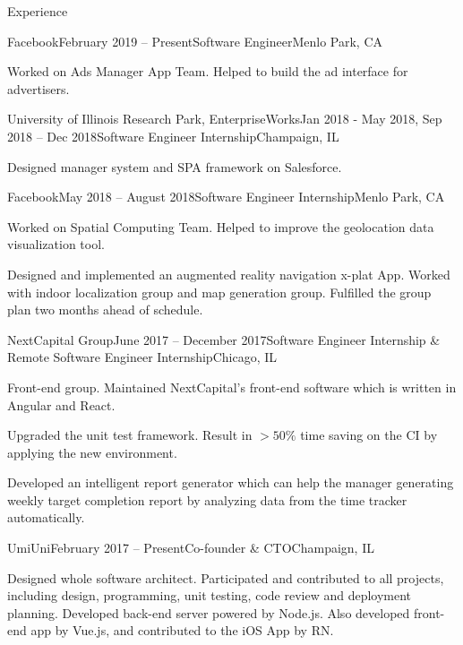 \documentclass{resume} %
\begin{document}
\begin{rSection}{Experience}

\begin{rSubsection}{Facebook}{February 2019 -- Present}{Software Engineer}{Menlo Park, CA}
\item Worked on Ads Manager App Team. Helped to build the ad interface for advertisers.
\end{rSubsection}

\begin{rSubsection}{University of Illinois Research Park, EnterpriseWorks}{Jan 2018 - May 2018, Sep 2018 -- Dec 2018}{Software Engineer Internship}{Champaign, IL}
\item Designed manager system and SPA framework on Salesforce.
\end{rSubsection}

\begin{rSubsection}{Facebook}{May 2018 -- August 2018}{Software Engineer Internship}{Menlo Park, CA}
\item Worked on Spatial Computing Team. Helped to improve the geolocation data visualization tool.
\item Designed and implemented an augmented reality navigation x-plat App. Worked with indoor localization group and map generation group. Fulfilled the group plan two months ahead of schedule.
\end{rSubsection}

\begin{rSubsection}{NextCapital Group}{June 2017 -- December 2017}{Software Engineer Internship \& Remote Software Engineer Internship}{Chicago, IL}

\item Front-end group. Maintained NextCapital's front-end software which is written in Angular and React.
\item Upgraded the unit test framework. Result in $>50\%$ time saving on the CI by applying the new environment.
\item Developed an intelligent report generator which can help the manager generating weekly target completion report by analyzing data from the time tracker automatically.

\end{rSubsection}

\begin{rSubsection}{UmiUni}{February 2017 -- Present}{Co-founder \& CTO}{Champaign, IL}

\item Designed whole software architect. Participated and contributed to all projects, including design, programming, unit testing, code review and deployment planning. Developed back-end server powered by Node.js. Also developed front-end app by Vue.js, and contributed to the iOS App by RN.


\end{rSubsection}
\end{rSection}
\end{document}
